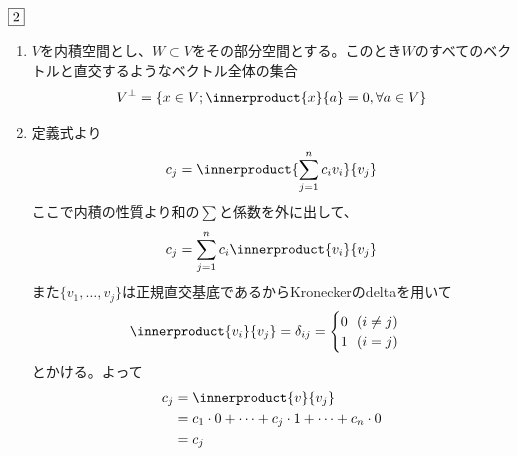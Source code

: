 \documentclass[dvipdfmx]{jsreport}
\begin{document}
\begin{souanswer} %
	$\fbox{2}$
\begin{enumerate}
	\item $V$を内積空間とし、$W\subset V$をその部分空間とする。このとき$W$のすべてのベクトルと直交するようなベクトル全体の集合
\begin{equation*}
	V^\perp= \{x\in V; \innerproduct{x}{a}= 0, \forall a\in V\}
\end{equation*}

	\item 定義式より
\begin{equation*}
	c_j= \innerproduct{\sum_{j= 1}^n c_iv_i}{v_j}
\end{equation*}
	ここで内積の性質より和の$\sum$と係数を外に出して、
\begin{equation*}
	c_j= \sum_{j= 1}^n c_i\innerproduct{v_i}{v_j}
\end{equation*}
	また$\{v_1, \ldots, v_j\}$は正規直交基底であるからKroneckerのdeltaを用いて
\begin{equation*}
	\innerproduct{v_i}{v_j}= \delta_{ij}= 
	\begin{cases}
		0\ \ (i\ne j)\\
		1\ \ (i= j)
	\end{cases}
\end{equation*}
	とかける。よって
\begin{align*}
	c_j
	&= \innerproduct{v}{v_j}\\
	&= c_1\cdot 0+ \cdots+ c_j\cdot 1+ \cdots+ c_n\cdot 0\\
	&= c_j	
\end{align*}


\end{enumerate}
\end{souanswer}
\end{document}
